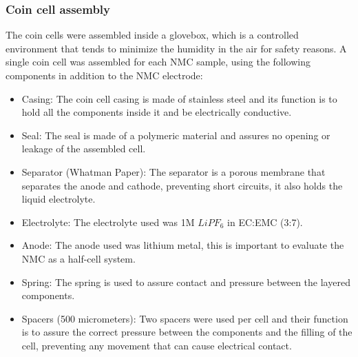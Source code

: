 \documentclass{article}
\begin{document}
\subsubsection{Coin cell assembly}
The coin cells were assembled inside a glovebox, which is a controlled environment that tends
to minimize the humidity in the air for safety reasons. A single coin cell was assembled for each NMC sample, using the following components in addition to the NMC electrode:
\begin {itemize}
\item Casing: The coin cell casing is made of stainless steel and its function is to hold all the components inside it and be electrically conductive.
\item Seal: The seal is made of a polymeric material and assures no opening or leakage of the assembled cell.  
\item Separator (Whatman Paper): The separator is a porous membrane that separates the anode and cathode, preventing short circuits, it also holds the liquid electrolyte. 
\item Electrolyte: The electrolyte used was 1M \(LiPF_6\) in EC:EMC (3:7).
\item Anode: The anode used was lithium metal, this is important to evaluate the NMC as a half-cell system. 
\item Spring: The spring is used to assure contact and pressure between the layered components. 
\item Spacers (500 micrometers): Two spacers were used per cell and their function is to assure the correct pressure between the components and the filling of the cell, preventing any movement that can cause electrical contact. 
\end{itemize}
\end{document}
